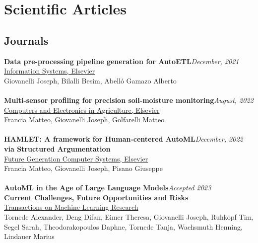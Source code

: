 \section*{Scientific Articles}

\subsection*{Journals}

\textbf{Data pre-processing pipeline generation for AutoETL}\hfill \textit{December, 2021}\\
\underline{Information Systems, Elsevier}\\
Giovanelli Joseph, Bilalli Besim, Abelló Gamazo Alberto\\
\\
\textbf{Multi-sensor profiling for precision soil-moisture monitoring}\hfill \textit{August, 2022}\\
\underline{Computers and Electronics in Agriculture, Elsevier}\\
Francia Matteo, Giovanelli Joseph, Golfarelli Matteo\\
\\
\textbf{HAMLET: A framework for Human-centered AutoML}\hfill \textit{December, 2022}\\
\textbf{via Structured Argumentation}\\
\underline{Future Generation Computer Systems, Elsevier}\\
Francia Matteo, Giovanelli Joseph, Pisano Giuseppe\\
\\
\textbf{AutoML in the Age of Large Language Models}\hfill \textit{Accepted 2023}\\
\textbf{Current Challenges, Future Opportunities and Risks}\\
\underline{Transactions on Machine Learning Research}\\
Tornede Alexander, Deng Difan, Eimer Theresa, Giovanelli Joseph, Ruhkopf Tim, Segel Sarah, Theodorakopoulos Daphne, Tornede Tanja, Wachsmuth Henning, Lindauer Marius\\
